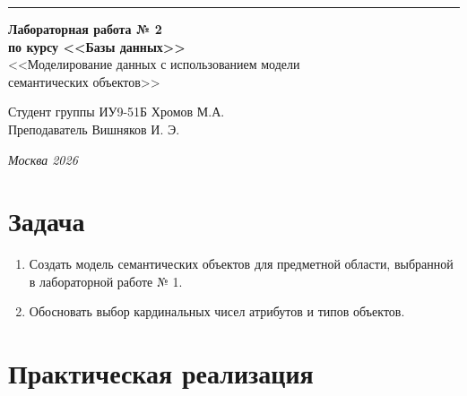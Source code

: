 \documentclass[a4paper, 14pt]{extarticle}
\begin{document}
\begin{titlepage}
\vspace*{-16pt}
\hspace{30pt}\rule{0.866\textwidth}{0.4pt}

\vspace{11em}

\begin{center}
\Large {\bf Лабораторная работа № 2} \\

\large {\bf по курсу <<Базы данных>>} \\[0.8cm]

\large <<Моделирование данных с использованием модели\\
семантических объектов>>
\end{center}
\normalsize

\vspace{8em}


\begin{flushright}
  {Студент группы ИУ9-51Б Хромов М.А. \hspace*{15pt}\\
  \vspace{2ex}
  Преподаватель Вишняков И. Э.\hspace*{15pt}}
\end{flushright}

\bigskip

\vfill


\begin{center}
\textsl{Москва 2026}
\end{center}
\end{titlepage}



\setcounter{page}{2}

\section{Задача}

\begin{enumerate}
  \item Создать модель семантических объектов для предметной области, выбранной в лабораторной работе № 1.
  \item Обосновать выбор кардинальных чисел атрибутов и типов объектов.
\end{enumerate}

\section{Практическая реализация}
\end{document}
